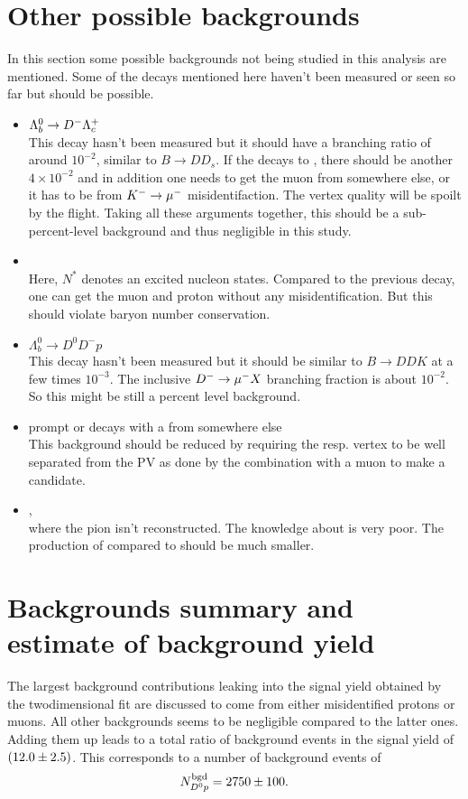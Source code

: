 \section{Other possible backgrounds}
In this section some possible backgrounds not being studied in this analysis are mentioned.
Some of the decays mentioned here haven't been measured or seen so far but should be possible.
\begin{itemize}
    \item $\Lambda_b^0 \rightarrow {\ensuremath{{D}^-}} {\ensuremath{{\Lambda}^+_{c}}}$ \\
          This decay hasn't been measured but it should have a branching ratio of around $10^{-2}$, similar to $B \rightarrow D D_s$.
          If the \Lc decays to \pKpi, there should be another $4 \times 10^{-2}$ and in addition one needs to get the muon from somewhere else, or it has to be from ${{K}^-} \rightarrow {\ensuremath{\mu^-}}$ misidentifaction. 
          The vertex quality will be spoilt by the \Lc flight.
          Taking all these arguments together, this should be a sub-percent-level background and thus negligible in this study.
    \item {} \\
          Here, $N^*$ denotes an excited nucleon states.
          Compared to the previous decay, one can get the muon and proton without any misidentification.
          But this should violate baryon number conservation.
    \item $\Lambda_b^0 \rightarrow D^0 D^- p$ \\
          This decay hasn't been measured but it should be similar to $B \rightarrow DDK$ at a few times $10^{-3}$.
          The inclusive ${{D}^-} \rightarrow {\ensuremath{\mu^-}} X$ branching fraction is about $10^{-2}$.
          So this might be still a percent level background.
    \item prompt \LcResI or \LcResII decays with a \mun from somewhere else \\
          This background should be reduced by requiring the \LcResI resp. \LcResII vertex to be well separated from the PV as done by the combination with a muon to make a \Lb candidate.
    \item \decay{\SigmabRes}{\Lb \pi}, \\ 
          where the pion isn't reconstructed.
          The knowledge about \SigmabRes is very poor.
          The production of \SigmabRes compared to \Lb should be much smaller.
\end{itemize}

\section{Backgrounds summary and estimate of background yield}
The largest background contributions leaking into the signal yield \NDp obtained by the twodimensional fit are discussed to come from either misidentified protons or muons.
All other backgrounds seems to be negligible compared to the latter ones.
Adding them up leads to a total ratio of background events in the signal yield of $(12.0 \pm 2.5)$.
This corresponds to a number of background events of 
\begin{align*}
    N^{\rm bgd}_{{{D}^0}{p}} = 2750 \pm 100.
\end{align*}
